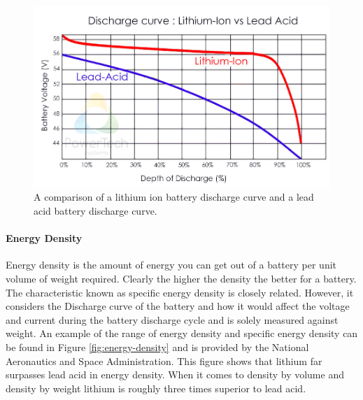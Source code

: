 \begin{figure}
    \centering
    \includegraphics[scale=0.4]{figures/discharge curve.png}
    \caption{A comparison of a lithium ion battery discharge curve and a lead acid battery discharge curve.}
    \label{fig:discharge-curve} 
\end{figure}

\paragraph{Energy Density}
Energy density is the amount of energy you can get out of a battery per unit volume of weight required. Clearly the higher the density the better for a battery. The characteristic known as specific energy density is closely related. However, it considers the Discharge curve of the battery and how it would affect the voltage and current during the battery discharge cycle and is solely measured against weight. An example of the range of energy density and specific energy density can be found in Figure \ref{fig:energy-density} and is provided by the National Aeronautics and Space Administration. This figure shows that lithium far surpasses lead acid in energy density. When it comes to density by volume and density by weight lithium is roughly three times superior to lead acid.

